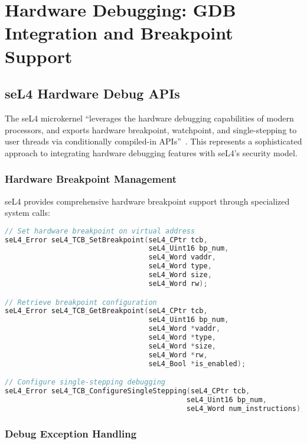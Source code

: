 \documentclass[11pt,a4paper]{article}
\begin{document}
\section{Hardware Debugging: GDB Integration and Breakpoint Support}

\subsection{seL4 Hardware Debug APIs}

The seL4 microkernel ``leverages the hardware debugging capabilities of modern processors, and exports hardware breakpoint, watchpoint, and single-stepping to user threads via conditionally compiled-in APIs''~\cite{sel4-hardware-debug-tutorial}. This represents a sophisticated approach to integrating hardware debugging features with seL4's security model.

\subsubsection{Hardware Breakpoint Management}

seL4 provides comprehensive hardware breakpoint support through specialized system calls:

\begin{lstlisting}[caption=seL4 Hardware Breakpoint APIs, language=C]
// Set hardware breakpoint on virtual address
seL4_Error seL4_TCB_SetBreakpoint(seL4_CPtr tcb, 
                                  seL4_Uint16 bp_num,
                                  seL4_Word vaddr, 
                                  seL4_Word type, 
                                  seL4_Word size, 
                                  seL4_Word rw);

// Retrieve breakpoint configuration
seL4_Error seL4_TCB_GetBreakpoint(seL4_CPtr tcb, 
                                  seL4_Uint16 bp_num,
                                  seL4_Word *vaddr, 
                                  seL4_Word *type, 
                                  seL4_Word *size, 
                                  seL4_Word *rw,
                                  seL4_Bool *is_enabled);

// Configure single-stepping debugging
seL4_Error seL4_TCB_ConfigureSingleStepping(seL4_CPtr tcb,
                                           seL4_Uint16 bp_num,
                                           seL4_Word num_instructions);
\end{lstlisting}

\subsubsection{Debug Exception Handling}
\end{document}
